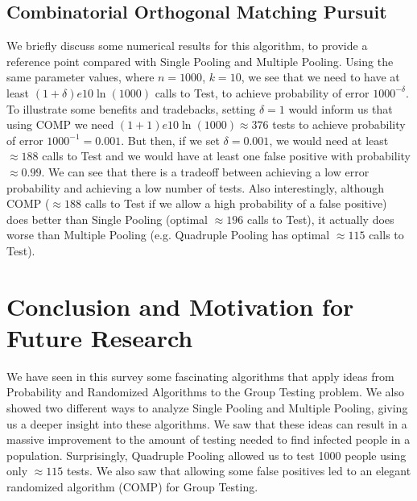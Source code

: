 \documentclass[12pt]{article}
\begin{document}
\subsection{Combinatorial Orthogonal Matching Pursuit}
We briefly discuss some numerical results for this algorithm, to provide a reference point compared with Single Pooling and Multiple Pooling. Using the same parameter values, where $n=1000$, $k=10$, we see that we need to have at least $(1+\delta)e 10 \ln (1000)$ calls to {\sf Test}, to achieve probability of error $1000^{-\delta}$. To illustrate some benefits and tradebacks, setting $\delta = 1$ would inform us that using COMP we need $(1+1)e 10 \ln (1000) \approx 376$ tests to achieve probability of error $1000^{-1}=0.001$. But then, if we set $\delta = 0.001$, we would need at least $\approx 188$ calls to {\sf Test} and we would have at least one false positive with probability $\approx 0.99$. We can see that there is a tradeoff between achieving a low error probability and achieving a low number of tests. Also interestingly, although COMP ($\approx 188$ calls to {\sf Test} if we allow a high probability of a false positive) does better than Single Pooling (optimal $\approx 196$ calls to {\sf Test}), it actually does worse than Multiple Pooling (e.g. Quadruple Pooling has optimal $\approx 115$ calls to {\sf Test}).

\section{Conclusion and Motivation for Future Research}

We have seen in this survey some fascinating algorithms that apply ideas from Probability and Randomized Algorithms to the Group Testing problem. We also showed two different ways to analyze Single Pooling and Multiple Pooling, giving us a deeper insight into these algorithms. We saw that these ideas can result in a massive improvement to the amount of testing needed to find infected people in a population. Surprisingly, Quadruple Pooling allowed us to test 1000 people using only $\approx 115$ tests. We also saw that allowing some false positives led to an elegant randomized algorithm (COMP) for Group Testing.
\end{document}

